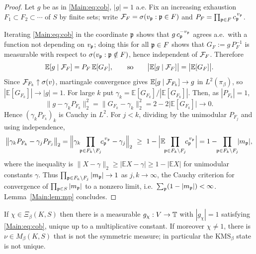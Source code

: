 \begin{proof}
Let $g$ be as in \eqref{Main:eq:cob}, $|g|=1$ a.e. Fix an increasing exhaustion
$F_1\subset F_2\subset\cdots$ of $S$ by finite sets; write
$\mathcal{F}_F=\sigma(v_{\mathfrak{p}}:\mathfrak{p}\in F)$ and $P_F=\prod_{\mathfrak{p}\in F}c_{\mathfrak{p}}^{\,v_{\mathfrak{p}}}$.

Iterating \eqref{Main:eq:cob} in the coordinate $\mathfrak{p}$ shows that $g\,c_{\mathfrak{p}}^{-v_{\mathfrak{p}}}$
agrees a.e.\ with a function not depending on $v_{\mathfrak{p}}$; doing this for all
$\mathfrak{p}\in F$ shows that $G_F:=g\,P_F^{-1}$ is measurable with respect to
$\sigma(v_{\mathfrak{p}}:\mathfrak{p}\notin F)$, hence independent of $\mathcal{F}_F$. Therefore
\[
\mathbb E[g\mid\mathcal{F}_F]=P_F\,\mathbb E[G_F],\qquad\text{so}\qquad\bigl|\mathbb E[g\mid\mathcal{F}_F]\bigr|=\bigl|\mathbb E[G_F]\bigr| .
\]
Since $\mathcal{F}_{F_k}\uparrow\sigma(v)$, martingale convergence gives
$\mathbb E[g\mid\mathcal{F}_{F_k}]\to g$ in $L^2(\pi_\beta)$, so
$|\mathbb E[G_{F_k}]|\to|g|=1$. For large $k$ put
$\gamma_k=\mathbb E[G_{F_k}]/|\mathbb E[G_{F_k}]|$. Then, as $|P_{F_k}|=1$,
\[
\bigl\|g-\gamma_kP_{F_k}\bigr\|_2^2=\bigl\|G_{F_k}-\gamma_k\bigr\|_2^2=2-2\bigl|\mathbb E[G_{F_k}]\bigr|\longrightarrow0 .
\]
Hence $(\gamma_kP_{F_k})_k$ is Cauchy in $L^2$. For $j<k$, dividing by the
unimodular $P_{F_j}$ and using independence,
\[
\bigl\|\gamma_kP_{F_k}-\gamma_jP_{F_j}\bigr\|_2
=\Bigl\|\gamma_k\!\!\prod_{\pp\in F_k\setminus F_j}\!\!c_\pp^{\,v_\pp}-\gamma_j\Bigr\|_2
\ \ge\ 1-\Bigl|\mathbb E\!\!\prod_{\pp\in F_k\setminus F_j}\!\!c_\pp^{\,v_\pp}\Bigr|
=1-\!\!\prod_{\pp\in F_k\setminus F_j}\!\!|m_\pp| ,
\]
where the inequality is $\|X-\gamma\|_2\ge|\mathbb E X-\gamma|\ge1-|\mathbb E X|$
for unimodular constants $\gamma$. Thus
$\prod_{\mathfrak{p}\in F_k\setminus F_j}|m_{\mathfrak{p}}|\to1$ as $j,k\to\infty$, the Cauchy
criterion for convergence of $\prod_{\mathfrak{p}\in S}|m_{\mathfrak{p}}|$ to a nonzero limit, i.e.\
$\sum_{\mathfrak{p}}(1-|m_{\mathfrak{p}}|)<\infty$. Lemma~\ref{Main:lem:mp} concludes.
\end{proof}

\begin{proposition}[Sufficiency]\label{Main:prop:suff}
If $\chi\in\Xi_\beta(K,S)$ then there is a measurable $g_\chi:V\to\mathbb{T}$ with
$|g_\chi|=1$ satisfying \eqref{Main:eq:cob}, unique up to a multiplicative constant.
If moreover $\chi\neq1$, there is $\nu\in M_\beta(K,S)$ that is not the
symmetric measure; in particular the $\mathrm{KMS}_\beta$ state is not unique.
\end{proposition}

